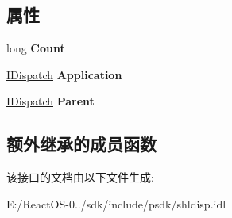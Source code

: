 \subsection*{属性}
\begin{DoxyCompactItemize}
\item 
\mbox{\label{interface_shell32_1_1_folder_item_verbs_aa8e592df0c0c82905d67921c553666b0}} 
long {\bfseries Count}
\item 
\mbox{\label{interface_shell32_1_1_folder_item_verbs_ae403b1a9c9ed9443b8c8955330d0fb8b}} 
\hyperlink{interface_i_dispatch}{I\+Dispatch} {\bfseries Application}
\item 
\mbox{\label{interface_shell32_1_1_folder_item_verbs_a008278eab846d5d3b80faae924026495}} 
\hyperlink{interface_i_dispatch}{I\+Dispatch} {\bfseries Parent}
\end{DoxyCompactItemize}
\subsection*{额外继承的成员函数}


该接口的文档由以下文件生成\+:\begin{DoxyCompactItemize}
\item 
E\+:/\+React\+O\+S-\/0../sdk/include/psdk/shldisp.\+idl\end{DoxyCompactItemize}
